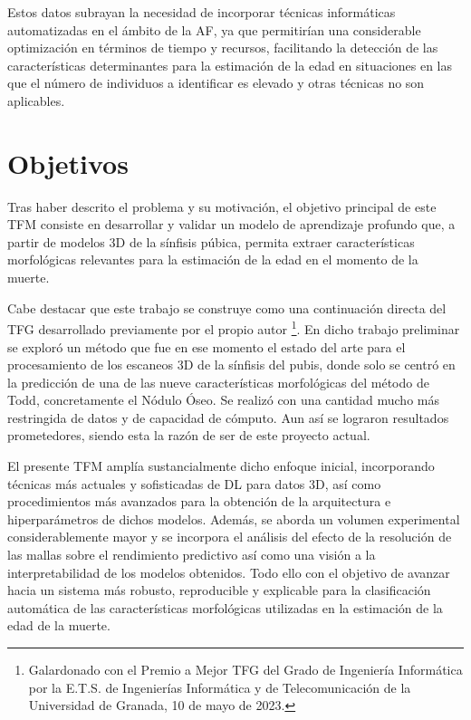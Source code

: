Estos datos subrayan la necesidad de incorporar técnicas informáticas automatizadas en el ámbito de la AF, ya que permitirían una considerable optimización en términos de tiempo y recursos, facilitando la detección de las características determinantes para la estimación de la edad en situaciones en las que el número de individuos a identificar es elevado y otras técnicas no son aplicables.

\section{Objetivos}

Tras haber descrito el problema y su motivación, el objetivo principal de este TFM consiste en desarrollar y validar un modelo de aprendizaje profundo que, a partir de modelos 3D de la sínfisis púbica, permita extraer características morfológicas relevantes para la estimación de la edad en el momento de la muerte.

Cabe destacar que este trabajo se construye como una continuación directa del TFG desarrollado previamente por el propio autor \cite{lugli_tfg_2022}\footnote{Galardonado con el Premio a Mejor TFG del Grado de Ingeniería Informática por la E.T.S. de Ingenierías Informática y de Telecomunicación de la Universidad de Granada, 10 de mayo de 2023.}. En dicho trabajo preliminar se exploró un método que fue en ese momento el estado del arte para el procesamiento de los escaneos 3D de la sínfisis del pubis, donde solo se centró en la predicción de una de las nueve características morfológicas del método de Todd, concretamente el Nódulo Óseo. Se realizó con una cantidad mucho más restringida de datos y de capacidad de cómputo. Aun así se lograron resultados prometedores, siendo esta la razón de ser de este proyecto actual.

El presente TFM amplía sustancialmente dicho enfoque inicial, incorporando técnicas más actuales y sofisticadas de DL para datos 3D, así como procedimientos más avanzados para la obtención de la arquitectura e hiperparámetros de dichos modelos. Además, se aborda un volumen experimental considerablemente mayor y se incorpora el análisis del efecto de la resolución de las mallas sobre el rendimiento predictivo así como una visión a la interpretabilidad de los modelos obtenidos. Todo ello con el objetivo de avanzar hacia un sistema más robusto, reproducible y explicable para la clasificación automática de las características morfológicas utilizadas en la estimación de la edad de la muerte.


